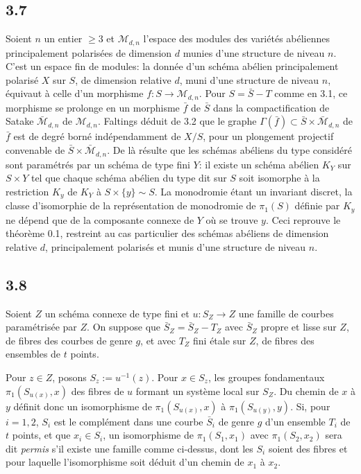 \documentclass[12pt,a4paper]{article}
\theoremstyle{plain}
\theoremstyle{definition}
\begin{document}
\subsection*{3.7}
Soient $n$ un entier $\geq 3$ et $\mathcal{M}_{d,n}$ l'espace des modules des vari\'{e}t\'{e}s ab\'{e}liennes principalement polaris\'{e}es de dimension $d$ munies d'une structure de niveau $n$. C'est un espace fin de modules: la donn\'{e}e d'un sch\'{e}ma ab\'{e}lien principalement polaris\'{e} $X$ sur $S$, de dimension relative $d$, muni d'une structure de niveau $n$, \'{e}quivaut \`{a} celle d'un morphisme $f : S \to \mathcal{M}_{d,n}$. Pour $S = \bar{S} - T$ comme en 3.1, ce morphisme se prolonge en un morphisme $\bar{f}$ de $\bar{S}$ dans la compactification de Satake $\bar{\mathcal{M}}_{d,n}$ de $\mathcal{M}_{d,n}$. Faltings d\'{e}duit de 3.2 que le graphe $\Gamma(\bar{f}) \subset \bar{S} \times \bar{\mathcal{M}}_{d,n}$ de $\bar{f}$ est de degr\'{e} born\'{e} ind\'{e}pendamment de $X/S$, pour un plongement projectif convenable de $\bar{S} \times \bar{\mathcal{M}}_{d,n}$. De l\`{a} r\'{e}sulte que les sch\'{e}mas ab\'{e}liens du type consid\'{e}r\'{e} sont param\'{e}tr\'{e}s par un sch\'{e}ma de type fini $Y$: il existe un sch\'{e}ma ab\'{e}lien $K_{Y}$ sur $S \times Y$ tel que chaque sch\'{e}ma ab\'{e}lien du type dit sur $S$ soit isomorphe \`{a} la restriction $K_{y}$ de $K_{Y}$ \`{a} $S \times \{y\} \sim S$. La monodromie \'{e}tant un invariant discret, la classe d'isomorphie de la repr\'{e}sentation de monodromie de $\pi_{1}(S)$ d\'{e}finie par $K_{y}$ ne d\'{e}pend que de la composante connexe de $Y$ o\`{u} se trouve $y$. Ceci reprouve le th\'{e}or\`{e}me 0.1, restreint au cas particulier des sch\'{e}mas ab\'{e}liens de dimension relative $d$, principalement polaris\'{e}s et munis d'une structure de niveau $n$.

\subsection*{3.8}
Soient $Z$ un sch\'{e}ma connexe de type fini et $u : S_{Z} \to Z$ une famille de courbes param\'{e}tris\'{e}e par $Z$. On suppose que $\bar{S}_{Z} = \bar{S}_{Z} - T_{Z}$ avec $\bar{S}_{Z}$ propre et lisse sur $Z$, de fibres des courbes de genre $g$, et avec $T_{Z}$ fini \'{e}tale sur $Z$, de fibres des ensembles de $t$ points.

Pour $z \in Z$, posons $S_{z} := u^{-1}(z)$. Pour $x \in S_{z}$, les groupes fondamentaux $\pi_{1}(S_{u(x)}, x)$ des fibres de $u$ formant un syst\`{e}me local sur $S_{Z}$. Du chemin de $x$ \`{a} $y$ d\'{e}finit donc un isomorphisme de $\pi_{1}(S_{u(x)}, x)$ \`{a} $\pi_{1}(S_{u(y)}, y)$. Si, pour $i = 1, 2$, $S_{i}$ est le compl\'{e}ment dans une courbe $\bar{S}_{i}$ de genre $g$ d'un ensemble $T_{i}$ de $t$ points, et que $x_{i} \in S_{i}$, un isomorphisme de $\pi_{1}(S_{1}, x_{1})$ avec $\pi_{1}(S_{2}, x_{2})$ sera dit \emph{permis} s'il existe une famille comme ci-dessus, dont les $S_{i}$ soient des fibres et pour laquelle l'isomorphisme soit d\'{e}duit d'un chemin de $x_{1}$ \`{a} $x_{2}$.
\end{document}
